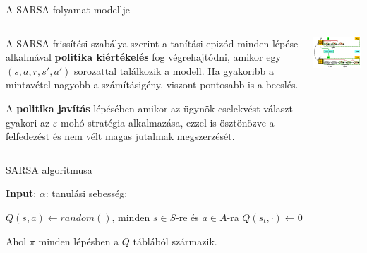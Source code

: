 \documentclass[english, aspectratio=169]{beamer}
\begin{document}
\begin{frame}{A SARSA folyamat modellje}
\begin{columns}
\begin{column}{.5\textwidth}
A SARSA frissítési szabálya szerint a tanítási epizód minden lépése alkalmával \textbf{politika kiértékelés} fog végrehajtódni, amikor egy $(s,a,r,s',a')$ sorozattal találkozik a modell. Ha gyakoribb a mintavétel nagyobb a számításigény, viszont pontosabb is a becslés.\par\smallskip
A \textbf{politika javítás} lépésében amikor az ügynök cselekvést választ gyakori az $\varepsilon$-mohó stratégia alkalmazása, ezzel is ösztönözve a felfedezést és nem vélt magas jutalmak megszerzését.
\end{column}
\begin{column}{.5\textwidth}
\begin{center}
\includegraphics[width=7cm, keepaspectratio]{images/mc_td_10.png}
\end{center}
\end{column}
\end{columns}
\end{frame}

\begin{frame}{SARSA algoritmusa}
\begin{small}
\begin{algorithm}[H]
\caption{SARSA algoritmus $Q \approx Q_*$ megbecslésére}
\SetAlgoLined
\textbf{Input}: $\alpha$: tanulási sebesség;\par\smallskip
$Q(s,a) \leftarrow random()$, minden $s \in S$-re és $a \in A$-ra\;
$Q(s_t,\cdot) \leftarrow 0$
\end{algorithm}
\end{small}
Ahol $\pi$ minden lépésben a $Q$ táblából származik.
\end{frame}
\end{document}
